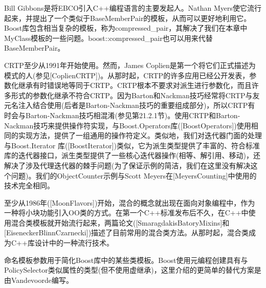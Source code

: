 Bill Gibbons是将EBCO引入C++编程语言的主要发起人。Nathan Myers使它流行起来，并提出了一个类似于BaseMemberPair的模板，从而可以更好地利用它。Boost库包含相当复杂的模板，称为compressed\_pair，其解决了我们在本章中MyClass模板的一些问题。boost::compressed\_pair也可以用来代替BaseMemberPair。

CRTP至少从1991年开始使用。然而，James Coplien是第一个将它们正式描述为模式的人(参见[CoplienCRTP])。从那时起，CRTP的许多应用已经公开发表，参数化继承有时错误地等同于CRTP。CRTP根本不要求对派生进行参数化，而且许多形式的参数化继承不符合CRTP。因为Barton和Nackman技巧经常将CRTP与友元名注入结合使用(后者是Barton-Nackman技巧的重要组成部分)，所以CRTP有时会与Barton-Nackman技巧相混淆(参见第21.2.1节)。使用CRTP和Barton-Nackman技巧来提供操作符实现，与Boost.Operators库([BoostOperators])使用相同的实现方法，提供了一组通用的操作符定义。类似地，我们对迭代器门面的处理与Boost.Iterator 库([BoostIterator])类似，它为派生类型提供了丰富的、符合标准库的迭代器接口，派生类型提供了一些核心迭代器操作(相等、解引用、移动)，还解决了涉及代理迭代器的棘手问题(为了保证示例的简洁，我们在这里没有解决这个问题)。我们的ObjectCounter示例与Scott Meyers在[MeyersCounting]中使用的技术完全相同。

至少从1986年([MoonFlavors])开始，混合的概念就出现在面向对象编程中，作为一种将小块功能引入OO类的方式。在第一个C++标准发布后不久，在C++中使用混合类模板就开始流行起来，两篇论文([SmaragdakisBatoryMixins]和[EiseneckerBlinnCzarnecki])描述了目前常用的混合类方法。从那时起，混合类成为C++库设计中的一种流行技术。

命名模板参数用于简化Boost库中的某些类模板。Boost使用元编程创建具有与PolicySelector类似属性的类型(但不使用虚继承)，这里介绍的更简单的替代方案是由Vandevoorde编写。